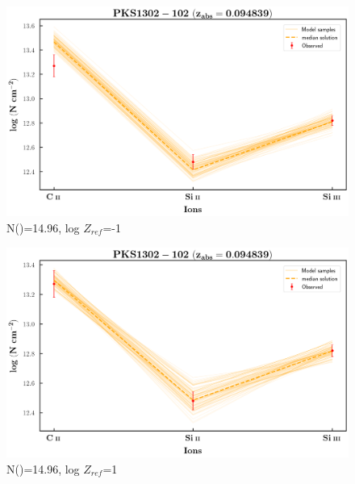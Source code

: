 \documentclass[12pt,draft]{report}
\newcommand\ion[2]{\text{#1\,\textsc{\lowercase{#2}}}}
\begin{document}
\begin{figure}[!t]
    \centering
    \includegraphics[width=0.9\linewidth]{Ionisation-Modelling-Plots/pks1302-z=0.094839-compII_logZ=-1.png}
    \caption{N(\ion{H}{i})=14.96, log $Z_{ref}$=-1}
\end{figure}

\begin{figure}[!b]
    \centering
    \includegraphics[width=0.9\linewidth]{Ionisation-Modelling-Plots/pks1302-z=0.094839-compII_logZ=1.png}
    \caption{N(\ion{H}{i})=14.96, log $Z_{ref}$=1}
\end{figure}



\newpage
\end{document}

